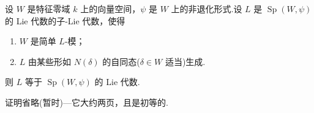 \begin{lemma}\label{lem:32.8}
设 $W$ 是特征零域 $k$ 上的向量空间，$\psi$ 是 $W$ 上的非退化形式.设 $L$ 是 $\operatorname{Sp}(W, \psi)$ 的 Lie 代数的子-Lie 代数，使得
\begin{enumerate}
  \item $W$ 是简单 $L$-模；
  \item $L$ 由某些形如 $N(\delta)$ 的自同态($\delta \in W$ 适当)生成.
\end{enumerate}
则 $L$ 等于 $\operatorname{Sp}(W, \psi)$ 的 Lie 代数.
\end{lemma}

证明省略(暂时)---它大约两页，且是初等的.
